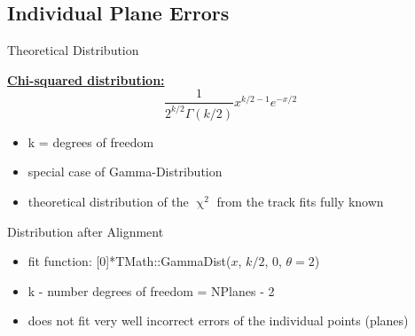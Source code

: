 \subsection{Individual Plane Errors}
\begin{frame}{Theoretical Distribution}

	\textbf{\underline{Chi-squared distribution:}}
	\begin{equation*}
		\frac{1}{2^{k/2}\Gamma\left(k/2\right)}x^{k/2-1}e^{-x/2}
	\end{equation*}
	

	\begin{itemize}\itemfill
		\item k = degrees of freedom
		\item special case of Gamma-Distribution %
		\item theoretical distribution of the $\upchi^2$ from the track fits fully known
	\end{itemize}
	
\end{frame}
\begin{frame}{Distribution after Alignment}

	
	\begin{itemize}\itemfill
		\item fit function: [0]*TMath::GammaDist($x$, $k/2$, 0, $\theta = 2$)
		\item k - number degrees of freedom = NPlanes - 2
		\item does not fit very well \ra incorrect errors of the individual points (planes)
	\end{itemize}
	
\end{frame}

